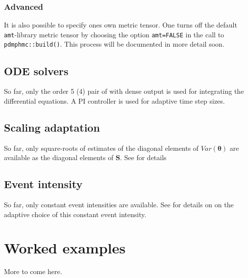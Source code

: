 \documentclass[
]{book}
\begin{document}
\hypertarget{advanced}{%
\subsection{Advanced}\label{advanced}}

It is also possible to specify ones own metric tensor. One turns off the default \texttt{amt}-library metric tensor by choosing the option \texttt{amt=FALSE} in the call to \texttt{pdmphmc::build()}. This process will be documented in more detail soon.

\hypertarget{ODE-solvers}{%
\section{ODE solvers}\label{ODE-solvers}}

So far, only the order 5 (4) pair of \citet{DORMAND198019} with dense output is used for integrating the differential equations. A PI controller is used for adaptive time step sizes.

\hypertarget{scaling-adaptation}{%
\section{Scaling adaptation}\label{scaling-adaptation}}

So far, only square-roots of estimates of the diagonal elements of \(Var(\boldsymbol \theta)\) are available as the diagonal elements of \(\mathbf S\). See \citet{kleppe_CTHMC} for details

\hypertarget{event-intensity}{%
\section{Event intensity}\label{event-intensity}}

So far, only constant event intensities are available. See \citet{kleppe_CTHMC} for details on on the adaptive choice of this constant event intensity.

\hypertarget{worked-examples}{%
\chapter{Worked examples}\label{worked-examples}}

More to come here.

  
\end{document}

